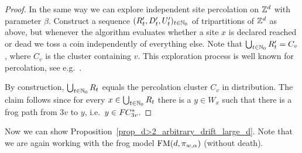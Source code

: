 \begin{proof}
In the same way we can explore independent site percolation on $\mathbb{Z}^d$ with parameter $\beta$. Construct a sequence $(R_t', D_t', U_t')_{t\in \mathbb{N}_0}$ of tripartitions of $\mathbb{Z}^d$ as above, but whenever the algorithm evaluates whether a site $x$ is declared reached or dead we toss a coin independently of everything else. Note that $\bigcup_{t \in \mathbb{N}_0} R_t' = C_v$, where $C_v$ is the cluster containing $v$. This exploration process is well known for percolation, see e.g.~\cite[Proof of Theorem 4, Chapter 1]{BR06}.

By construction, $\bigcup_{t\in \mathbb{N}_0} R_t$ equals the percolation cluster $C_v$ in distribution. The claim follows since for every $x \in \bigcup_{t\in \mathbb{N}_0} R_t$ there is a $y \in W_x$ such that there is a frog path from $3v$ to $y$, i.e.~$y \in F\hspace{-0.04em}C_{3v}^*$. 
\end{proof}

Now we can show Proposition~\ref{prop_d>2_arbitrary_drift_large_d}. Note that we are again working with the frog model $\operatorname{FM}(d,\pi_{w,\alpha})$ (without death).

